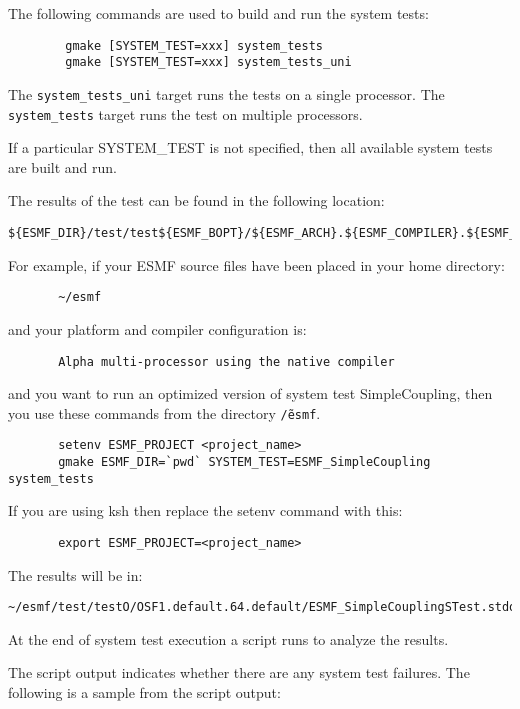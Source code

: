 The following commands are used to build and run the system tests:

\begin{verbatim}
        gmake [SYSTEM_TEST=xxx] system_tests
        gmake [SYSTEM_TEST=xxx] system_tests_uni
\end{verbatim}

The {\tt system\_tests\_uni} target runs the tests on a single processor. 
The {\tt system\_tests} target runs the test on multiple processors.

If a particular SYSTEM\_TEST is not specified, then all available system tests 
are built and run.

The results of the test can be found in the following location:
\begin{verbatim}
${ESMF_DIR}/test/test${ESMF_BOPT}/${ESMF_ARCH}.${ESMF_COMPILER}.${ESMF_PREC}.${ESMF_SITE}
\end{verbatim}

For example, if your ESMF source files have been placed in your home directory:
\begin{verbatim}
       ~/esmf
\end{verbatim}

and your platform and compiler configuration is:
\begin{verbatim}
       Alpha multi-processor using the native compiler
\end{verbatim}

and you want to run an optimized version of system test SimpleCoupling,
then you use these commands from the directory {\tt \~/esmf}. 
\begin{verbatim}
       setenv ESMF_PROJECT <project_name>
       gmake ESMF_DIR=`pwd` SYSTEM_TEST=ESMF_SimpleCoupling system_tests
\end{verbatim}

If you are using ksh then replace the setenv command with
this:

\begin{verbatim}
       export ESMF_PROJECT=<project_name>
\end{verbatim}

The results will be in:
\begin{verbatim}
~/esmf/test/testO/OSF1.default.64.default/ESMF_SimpleCouplingSTest.stdout
\end{verbatim}

At the end of system test execution a script runs to analyze the results.

The script output indicates whether there are any system test failures.
The following is a sample from the script output:

